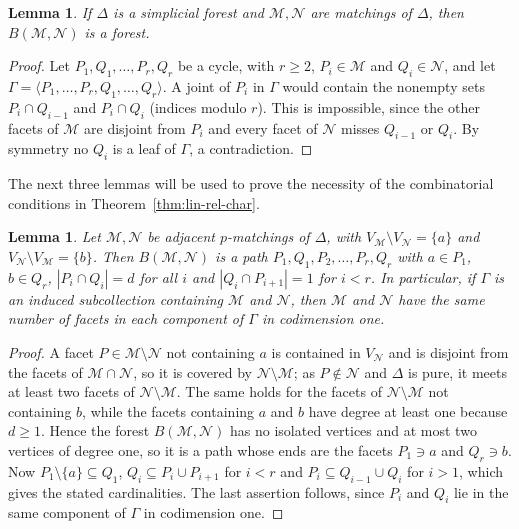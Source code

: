 \documentclass{amsart}
\newtheorem{Lemma}[Theorem]{Lemma}
\theoremstyle{definition}
\theoremstyle{remark}
\begin{document}
\begin{Lemma}\label{lem:bipartite-intersection-forest}
If $\Delta$ is a simplicial forest and $\mathcal M,\mathcal N$ are matchings of $\Delta$, then $B(\mathcal M,\mathcal N)$ is a forest.
\end{Lemma}

\begin{proof}
Let $P_1,Q_1,\ldots,P_r,Q_r$ be a cycle, with $r\geq 2$, $P_i\in\mathcal M$ and $Q_i\in\mathcal N$, and let $\Gamma=\langle P_1,\ldots,P_r,Q_1,\ldots,Q_r\rangle$. A joint of $P_i$ in $\Gamma$ would contain the nonempty sets $P_i\cap Q_{i-1}$ and $P_i\cap Q_i$ (indices modulo $r$). This is impossible, since the other facets of $\mathcal M$ are disjoint from $P_i$ and every facet of $\mathcal N$ misses $Q_{i-1}$ or $Q_i$. By symmetry no $Q_i$ is a leaf of $\Gamma$, a contradiction.
\end{proof}


The next three lemmas will be used to prove the necessity of the combinatorial conditions in Theorem~\ref{thm:lin-rel-char}.
\begin{Lemma}\label{lem:adjacent}
Let $\mathcal M,\mathcal N$ be adjacent $p$-matchings of $\Delta$, with $V_{\mathcal M}\setminus V_{\mathcal N}=\{a\}$ and $V_{\mathcal N}\setminus V_{\mathcal M}=\{b\}$. Then $B(\mathcal M,\mathcal N)$ is a path $P_1,Q_1,P_2,\ldots,P_r,Q_r$ with $a\in P_1$, $b\in Q_r$, $|P_i\cap Q_i|=d$ for all $i$ and $|Q_i\cap P_{i+1}|=1$ for $i<r$. In particular, if $\Gamma$ is an induced subcollection containing $\mathcal M$ and $\mathcal N$, then $\mathcal M$ and $\mathcal N$ have the same number of facets in each component of $\Gamma$ in codimension one.
\end{Lemma}

\begin{proof}
A facet $P\in\mathcal M\setminus\mathcal N$ not containing $a$ is contained in $V_{\mathcal N}$ and is disjoint from the facets of $\mathcal M\cap\mathcal N$, so it is covered by $\mathcal N\setminus\mathcal M$; as $P\notin\mathcal N$ and $\Delta$ is pure, it meets at least two facets of $\mathcal N\setminus\mathcal M$. The same holds for the facets of $\mathcal N\setminus\mathcal M$ not containing $b$, while the facets containing $a$ and $b$ have degree at least one because $d\geq 1$. Hence the forest $B(\mathcal M,\mathcal N)$ has no isolated vertices and at most two vertices of degree one, so it is a path whose ends are the facets $P_1\ni a$ and $Q_r\ni b$. Now $P_1\setminus\{a\}\subseteq Q_1$, $Q_i\subseteq P_i\cup P_{i+1}$ for $i<r$ and $P_i\subseteq Q_{i-1}\cup Q_i$ for $i>1$, which gives the stated cardinalities. The last assertion follows, since $P_i$ and $Q_i$ lie in the same component of $\Gamma$ in codimension one.
\end{proof}
\end{document}
